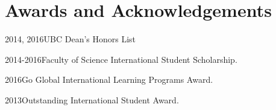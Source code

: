 \documentclass{tccv}
\begin{document}
    \section{Awards and Acknowledgements}
    
    \begin{factlist}
    \item{2014, 2016}{UBC Dean’s Honors List}
    \item{2014-2016}{Faculty of Science International Student Scholarship.}
    \item{2016}{Go Global International Learning Programs Award.}
    \item{2013}{Outstanding International Student Award.}
    \end{factlist}
    
    
\end{document}

